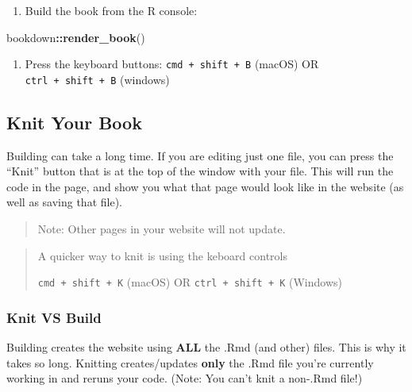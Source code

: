 \documentclass[
]{book}
\newenvironment{Shaded}{\begin{snugshade}}{\end{snugshade}}
\newcommand{\FunctionTok}[1]{\textcolor[rgb]{0.13,0.29,0.53}{\textbf{#1}}}
\newcommand{\NormalTok}[1]{#1}
\newcommand{\SpecialCharTok}[1]{\textcolor[rgb]{0.81,0.36,0.00}{\textbf{#1}}}
\providecommand{\tightlist}{%
  \setlength{\itemsep}{0pt}\setlength{\parskip}{0pt}}
\theoremstyle{definition}
\theoremstyle{definition}
\theoremstyle{definition}
\theoremstyle{definition}
\theoremstyle{remark}
\begin{document}
\begin{enumerate}
\def\labelenumi{\arabic{enumi}.}
\tightlist
\item
  Build the book from the R console:
\end{enumerate}

\begin{Shaded}
\begin{Highlighting}[]
\NormalTok{bookdown}\SpecialCharTok{::}\FunctionTok{render\_book}\NormalTok{()}
\end{Highlighting}
\end{Shaded}

\begin{enumerate}
\def\labelenumi{\arabic{enumi}.}
\setcounter{enumi}{1}
\tightlist
\item
  Press the keyboard buttons: \texttt{cmd\ +\ shift\ +\ B} (macOS) OR \texttt{ctrl\ +\ shift\ +\ B} (windows)
\end{enumerate}

\subsection{Knit Your Book}\label{knit-your-book}

Building can take a long time. If you are editing just one file, you can press the ``Knit'' button that is at the top of the window with your file. This will run the code in the page, and show you what that page would look like in the website (as well as saving that file).

\begin{quote}
Note: Other pages in your website will not update.
\end{quote}

\begin{quote}
A quicker way to knit is using the keboard controls

\texttt{cmd\ +\ shift\ +\ K} (macOS) OR \texttt{ctrl\ +\ shift\ +\ K} (Windows)
\end{quote}

\subsubsection{Knit VS Build}\label{knit-vs-build}

Building creates the website using \textbf{ALL} the .Rmd (and other) files. This is why it takes so long. Knitting creates/updates \textbf{only} the .Rmd file you're currently working in and reruns your code. (Note: You can't knit a non-.Rmd file!)
\end{document}
